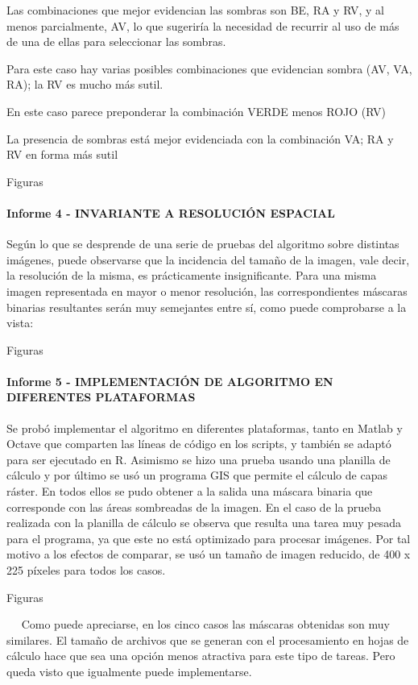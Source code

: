 Las combinaciones que mejor evidencian las sombras son BE, RA y RV, y al menos parcialmente, AV, lo que sugeriría la necesidad de recurrir al uso de más de una de ellas para seleccionar las sombras.

Para este caso hay varias posibles combinaciones que evidencian sombra (AV, VA, RA); la RV es mucho más sutil.

En este caso parece preponderar la combinación VERDE menos ROJO (RV)

La presencia de sombras está mejor evidenciada con la combinación VA; RA y RV en forma más sutil

Figuras

\paragraph{Informe 4 - INVARIANTE A RESOLUCIÓN ESPACIAL}
 Según lo que se desprende de una serie de pruebas del algoritmo sobre distintas imágenes, puede observarse que la incidencia del tamaño de la imagen, vale decir, la resolución de la misma, es prácticamente insignificante. Para una misma imagen representada en mayor o menor resolución, las correspondientes máscaras binarias resultantes serán muy semejantes entre sí, como puede comprobarse a la vista:

Figuras

\paragraph{Informe 5 - IMPLEMENTACIÓN DE ALGORITMO EN DIFERENTES PLATAFORMAS}
Se probó implementar el algoritmo en diferentes plataformas, tanto en Matlab y Octave que comparten las líneas de código en los scripts, y también se adaptó para ser ejecutado en R. Asimismo se hizo una prueba usando una planilla de cálculo y por último se usó un programa GIS que permite el cálculo de capas ráster. En todos ellos se pudo obtener a la salida una máscara binaria que corresponde con las áreas sombreadas de la imagen. En el caso de la prueba realizada con la planilla de cálculo se observa que resulta una tarea muy pesada para el programa, ya que este no está optimizado para procesar imágenes. Por tal motivo a los efectos de comparar, se usó un tamaño de imagen reducido, de 400 x 225 píxeles para todos los casos.


Figuras

 
Como puede apreciarse, en los cinco casos las máscaras obtenidas son muy similares. El tamaño de archivos que se generan con el procesamiento en hojas de cálculo hace que sea una opción menos atractiva para este tipo de tareas. Pero queda visto que igualmente puede implementarse.

